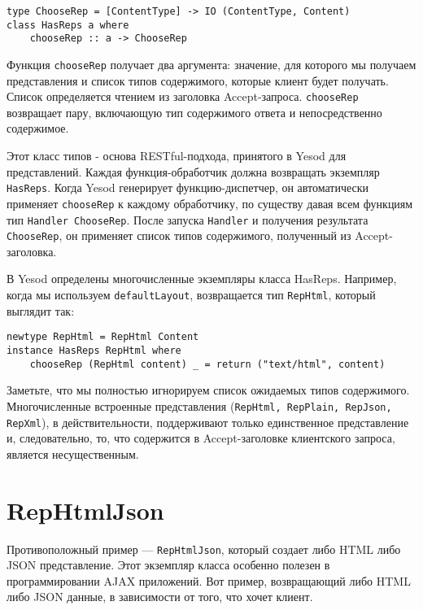 \begin{lstlisting}
type ChooseRep = [ContentType] -> IO (ContentType, Content)
class HasReps a where
    chooseRep :: a -> ChooseRep
\end{lstlisting}

Функция \lstinline'chooseRep' получает два аргумента: значение, для которого мы получаем представления и список типов содержимого, которые клиент будет получать. Список определяется чтением из заголовка Accept-запроса. \lstinline'chooseRep' возвращает пару, включающую тип содержимого ответа и непосредственно содержимое.


Этот класс типов - основа RESTful-подхода, принятого в Yesod для представлений. Каждая функция-обработчик должна возвращать экземпляр \lstinline'HasReps'. Когда Yesod генерирует функцию-диспетчер, он автоматически применяет \lstinline'chooseRep' к каждому обработчику, по существу давая всем функциям тип \lstinline'Handler ChooseRep'. После  запуска \lstinline'Handler' и получения результата \lstinline'ChooseRep',  он применяет список типов содержимого, полученный из Accept-заголовка.

В Yesod определены многочисленные экземпляры класса HasReps. Например, когда мы используем \lstinline'defaultLayout', возвращается тип \lstinline'RepHtml', который выглядит так:

\begin{lstlisting}
newtype RepHtml = RepHtml Content
instance HasReps RepHtml where
    chooseRep (RepHtml content) _ = return ("text/html", content)
\end{lstlisting}

Заметьте, что мы полностью игнорируем список ожидаемых типов содержимого. Многочисленные встроенные представления (\lstinline'RepHtml, RepPlain, RepJson, RepXml'), в действительности, поддерживают только единственное представление и, следовательно, то, что содержится в Accept-заголовке клиентского запроса, является несущественным.

\section{RepHtmlJson}

Противоположный пример --- \lstinline'RepHtmlJson', который создает либо HTML либо JSON представление. Этот экземпляр класса особенно полезен в программировании AJAX приложений. Вот пример, возвращающий либо HTML либо JSON данные, в зависимости от того, что хочет клиент. 

